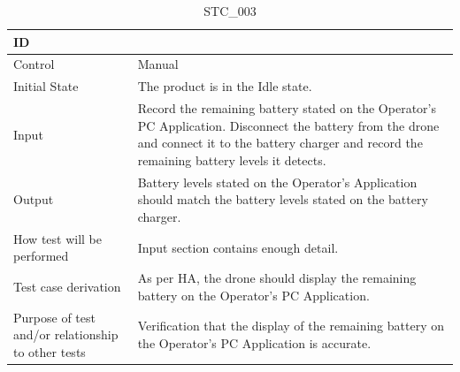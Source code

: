 \documentclass[12pt, titlepage]{article}
\begin{document}
\begin{table}[!h]
\begin{center}
\caption {STC\_003}
\label{tab:STC_003}
\begin{tabular}{ | m{3.2cm} | m{12.2cm} | } 
\hline
ID & \nameref{tab:STC_003} \\ 
\hline
Control & Manual \\ 
\hline
Initial State & The product is in the Idle state. \\ 
\hline
Input & Record the remaining battery stated on the Operator's PC Application. Disconnect the battery from the drone and connect it to the battery charger and record the remaining battery levels it detects. \\ 
\hline
Output & Battery levels stated on the Operator's Application should match the battery levels stated on the battery charger. \\ 
\hline
How test will be performed & Input section contains enough detail. \\ 
\hline
Test case derivation & As per HA, the drone should display the remaining battery on the Operator's PC Application. \\ 
\hline
Purpose of test and/or relationship to other tests & Verification that the display of the remaining battery on the Operator's PC Application is accurate. \\ 
\hline
\end{tabular}
\end{center}
\end{table}
\end{document}
